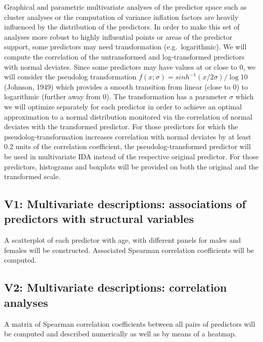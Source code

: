 \documentclass[
  letterpaper,
  DIV=11,
  numbers=noendperiod]{scrreport}
\begin{document}
Graphical and parametric multivariate analyses of the predictor space
such as cluster analyses or the computation of variance inflation
factors are heavily influenced by the distribution of the predictors. In
order to make this set of analyses more robust to highly influential
points or areas of the predictor support, some predictors may need
transformation (e.g.~logarithmic). We will compute the correlation of
the untransformed and log-transformed predictors with normal deviates.
Since some predictors may have values at or close to 0, we will consider
the pseudolog transformation
\(f(x;\sigma) = sinh^{-1}(x/2\sigma)/\log10\) (Johnson, 1949) which
provides a smooth transition from linear (close to 0) to logarithmic
(further away from 0). The transformation has a parameter \(\sigma\)
which we will optimize separately for each predictor in order to achieve
an optimal approximation to a normal distribution monitored via the
correlation of normal deviates with the transformed predictor. For those
predictors for which the pseudolog-transformation increases correlation
with normal deviates by at least 0.2 units of the correlation
coefficient, the pseudolog-transformed predictor will be used in
multivariate IDA instead of the respective original predictor. For those
predictors, histograms and boxplots will be provided on both the
original and the transformed scale.

\hypertarget{v1-multivariate-descriptions-associations-of-predictors-with-structural-variables}{%
\subsection{V1: Multivariate descriptions: associations of predictors
with structural
variables}\label{v1-multivariate-descriptions-associations-of-predictors-with-structural-variables}}

A scatterplot of each predictor with age, with different panels for
males and females will be constructed. Associated Spearman correlation
coefficients will be computed.

\hypertarget{v2-multivariate-descriptions-correlation-analyses}{%
\subsection{V2: Multivariate descriptions: correlation
analyses}\label{v2-multivariate-descriptions-correlation-analyses}}

A matrix of Spearman correlation coefficients between all pairs of
predictors will be computed and described numerically as well as by
means of a heatmap.
\end{document}
